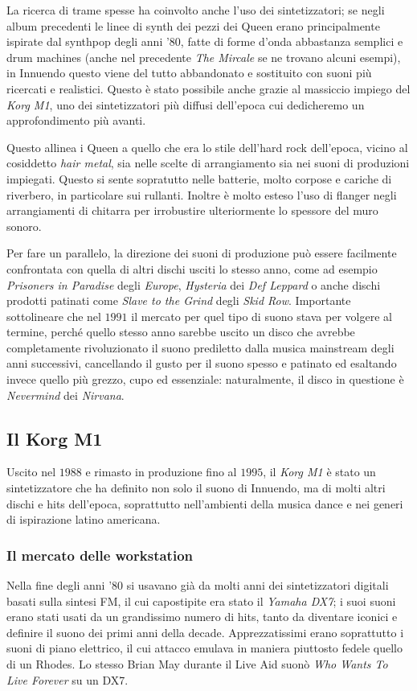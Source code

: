 \documentclass[12pt]{article}
\begin{document}
La ricerca di trame spesse ha coinvolto anche l'uso dei sintetizzatori; se negli album precedenti le linee di synth dei pezzi dei Queen erano principalmente ispirate dal synthpop degli anni '\(80\), fatte di forme d'onda abbastanza semplici e drum machines (anche nel precedente \emph{The Mircale} se ne trovano alcuni esempi), in Innuendo questo viene del tutto abbandonato e sostituito con suoni più ricercati e realistici. Questo è stato possibile anche grazie al massiccio impiego del \emph{Korg M1}, uno dei sintetizzatori più diffusi dell'epoca cui dedicheremo un approfondimento più avanti.

Questo allinea i Queen a quello che era lo stile dell'hard rock dell'epoca, vicino al cosiddetto \emph{hair metal}, sia nelle scelte di arrangiamento sia nei suoni di produzioni impiegati. Questo si sente sopratutto nelle batterie, molto corpose e cariche di riverbero, in particolare sui rullanti. Inoltre è molto esteso l'uso di flanger negli arrangiamenti di chitarra per irrobustire ulteriormente lo spessore del muro sonoro.

Per fare un parallelo, la direzione dei suoni di produzione può essere facilmente confrontata con quella di altri dischi usciti lo stesso anno, come ad esempio \emph{Prisoners in Paradise} degli \emph{Europe}, \emph{Hysteria} dei \emph{Def Leppard} o anche dischi prodotti patinati come \emph{Slave to the Grind} degli \emph{Skid Row}. Importante sottolineare che nel \(1991\) il mercato per quel tipo di suono stava per volgere al termine, perché quello stesso anno sarebbe uscito un disco che avrebbe completamente rivoluzionato il suono prediletto dalla musica mainstream degli anni successivi, cancellando il gusto per il suono spesso e patinato ed esaltando invece quello più grezzo, cupo ed essenziale: naturalmente, il disco in questione è \emph{Nevermind} dei \emph{Nirvana}.

\subsection{Il Korg M1}
Uscito nel \(1988\) e rimasto in produzione fino al \(1995\), il \emph{Korg M1} è stato un sintetizzatore che ha definito non solo il suono di Innuendo, ma di molti altri dischi e hits dell'epoca, soprattutto nell'ambienti della musica dance e nei generi di ispirazione latino americana.

\subsubsection{Il mercato delle workstation}
Nella fine degli anni '\(80\) si usavano già da molti anni dei sintetizzatori digitali basati sulla sintesi FM, il cui capostipite era stato il \emph{Yamaha DX7}; i suoi suoni erano stati usati da un grandissimo numero di hits, tanto da diventare iconici e definire il suono dei primi anni della decade. Apprezzatissimi erano soprattutto i suoni di piano elettrico, il cui attacco emulava in maniera piuttosto fedele quello di un Rhodes. Lo stesso Brian May durante il Live Aid suonò \emph{Who Wants To Live Forever} su un DX7.
\end{document}
